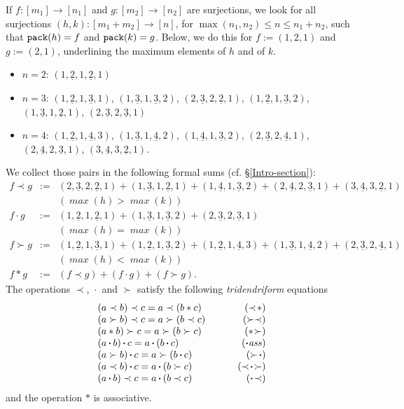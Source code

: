 \documentclass[11pt]{article}
\theoremstyle{definition}
\numberwithin{equation}{section}
\numberwithin{equation}{section}
\newcommand{\ul}[1]{\underline{#1}}
\newcommand{\bcdot}{\,{\bm \cdot}\,}
\newcommand{\precstar}{\prec\!\ast}
\newcommand{\astsucc}{\ast\!\succ}
\newcommand{\bcdotass}{\!\bcdot \!{\it ass}}
\newcommand{\succbcdot}{\succ\!\!\bcdot\!}
\newcommand{\bcdotprec}{\!\bcdot\!\!\prec}
\newcommand{\precbcdotsucc}{\prec\!\!\bcdot\!\!\succ}
\begin{document}
If $f:[m_1]\rightarrow[n_1]$ and $g:[m_2]\rightarrow[n_2]$ are surjections, we look for 
 all surjections $(h,k):[m_1+m_2]\rightarrow [n]$, for $\max(n_1,n_2)\leq n\leq n_1+n_2$,  such that
 ${\tt pack}(h)=f$ and ${\tt pack}(k)=g$.  Below, we do this for 
$f:=(1,2,1)$ and $g:=(2,1)$, underlining the maximum elements  of $h$ and of $k$.
\begin{itemize}
\item {\small $n=2$:   $(1,\ul{2},1,\ul{2},1)$}
\item {\small $n=3$: $(1,\ul{2},1,\ul{3},1)$, $(1,\ul{3},1,\ul{3},2)$, $(2,\ul{3},2,\ul{2},1)$, $(1,\ul{2},1,\ul{3},2)$,  $(1,\ul{3},1,\ul{2},1)$,  $(2,\ul{3},2,\ul{3},1)$}
\item {\small $n=4$:
$(1,\ul{2},1,\ul{4},3)$, $(1,\ul{3},1,\ul{4},2)$,  $(1,\ul{4},1,\ul{3},2)$,  $(2,\ul{3},2,\ul{4},1)$, $(2,\ul{4},2,\ul{3},1)$, $(3,\ul{4},3,\ul{2},1)$.}
\end{itemize}
We collect those pairs in the following formal sums (cf. \S\ref{Intro-section}): 
{\small{$$\begin{array}{lll}
 f\prec g&  := & {(2,\ul{3},2,\ul{2},1)} 
 +  {(1,\ul{3},1,\ul{2},1)} 
 +  {(1,\ul{4},1,\ul{3},2)} 
 +  {(2,\ul{4},2,\ul{3},1)} 
 +  (3,\ul{4},3,\ul{2},1)  \\
 && \mathit{(\max(h)>\max(k))}\\
  f\bcdot g & := &  {(1,\ul{2},1,\ul{2},1)} +  {(1,\ul{3},1,\ul{3},2)} + { (2,\ul{3},2,\ul{3},1)} \\
  && \mathit{(\max(h)=\max(k))}\\
  {  f\succ g}&  := &  {  (1,\ul{2},1,\ul{3},1)} 
  +  {  (1,\ul{2},1,\ul{3},2)}
  +  {  (1,\ul{2},1,\ul{4},3)}   +  {  (1,\ul{3},1,\ul{4},2)}
    +   {  (2,\ul{3},2,\ul{4},1)} \\
   & &\mathit{(\max(h)<\max(k))}\\
  f\ast g&  := & ({  f\prec g}) + ({  f\bcdot g}) + ({ f\succ g}).
\end{array}$$}}
\normalsize
   The operations $\prec$, $\bcdot$ and $\succ$ satisfy the following {\em tridendriform} equations
$$\begin{array}{lr}
 (a\prec b)\prec c=a\prec(b\ast c) & \quad\quad\quad\mathit{(\precstar)} \\
 (a\succ b)\prec c=a\succ(b\prec c) & \mathit{(\succ\prec)} \\
 (a\ast b)\succ c=a\succ(b\succ c) & \mathit{(\astsucc)} \\
(a\bcdot b)\bcdot c=a\bcdot(b\bcdot c) & \mathit{(\bcdotass)} \\
 (a\succ b)\bcdot c=a\succ(b\bcdot c) & \mathit{(\succbcdot)}  \\
 (a\prec b)\bcdot c=a\bcdot (b\succ c) & \mathit{(\precbcdotsucc)} \\ 
(a\bcdot b)\prec c=a\bcdot (b\prec c) & \mathit{(\bcdotprec)} \\
\end{array}$$
  and  the operation $\ast$ is associative.
\end{document}
